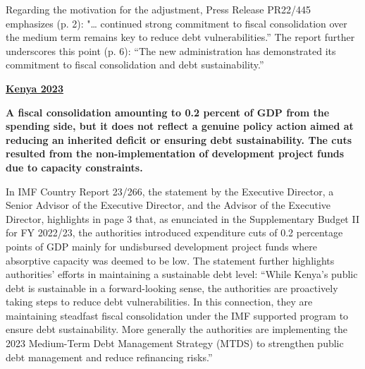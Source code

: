 Regarding the motivation for the adjustment, Press Release PR22/445 emphasizes (p. 2): "… continued strong commitment to fiscal consolidation over the medium term remains key to reduce debt vulnerabilities.” The report further underscores this point (p. 6): “The new administration has demonstrated its commitment to fiscal consolidation and debt sustainability.”

\textbf{\underline{Kenya 2023}}

\textbf{A fiscal consolidation amounting to 0.2 percent of GDP from the spending side, but it does not reflect a genuine policy action aimed at reducing an inherited deficit or ensuring debt sustainability. The cuts resulted from the non-implementation of development project funds due to capacity constraints.}

In IMF Country Report 23/266, the statement by the Executive Director, a Senior Advisor of the Executive Director, and the Advisor of the Executive Director, highlights in page 3 that, as enunciated in the Supplementary Budget II for FY 2022/23, the authorities introduced expenditure cuts of 0.2 percentage points of GDP mainly for undisbursed development project funds where absorptive capacity was deemed to be low. The statement further highlights authorities’ efforts in maintaining a sustainable debt level: “While Kenya’s public debt is sustainable in a forward-looking sense, the authorities are proactively taking steps to reduce debt vulnerabilities. In this connection, they are maintaining steadfast fiscal consolidation under the IMF supported program to ensure debt sustainability. More generally the authorities are implementing the 2023 Medium-Term Debt Management Strategy (MTDS) to strengthen public debt management and reduce refinancing risks.”

